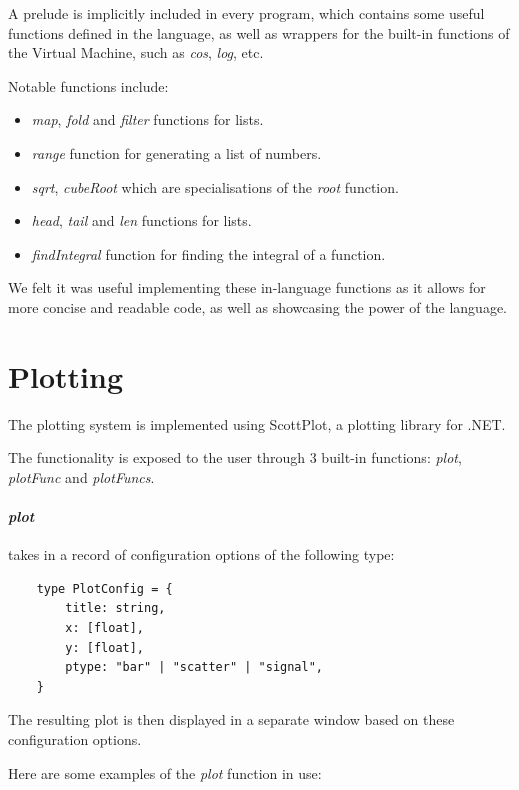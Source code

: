 A prelude is implicitly included in every program, which contains some useful functions defined in the language, as 
well as wrappers for the built-in functions of the Virtual Machine, such as \textit{cos}, \textit{log}, etc.

Notable functions include:

\begin{itemize}
    \item \textit{map}, \textit{fold} and \textit{filter} functions for lists.
    \item \textit{range} function for generating a list of numbers.
    \item \textit{sqrt}, \textit{cubeRoot} which are specialisations of the \textit{root} function.
    \item \textit{head}, \textit{tail} and \textit{len} functions for lists.
    \item \textit{findIntegral} function for finding the integral of a function.
\end{itemize}

We felt it was useful implementing these in-language functions as it allows for more concise and readable code, as
well as showcasing the power of the language.

\section{Plotting}\label{sec:plotting}

The plotting system is implemented using ScottPlot\citep{scottPlot}, a plotting library for .NET\@.

The functionality is exposed to the user through 3 built-in functions: \textit{plot}, \textit{plotFunc} and 
\textit{plotFuncs}.

\paragraph{\textit{plot}} takes in a record of configuration options of the following type:

\begin{verbatim}
    type PlotConfig = {
        title: string,
        x: [float],
        y: [float],
        ptype: "bar" | "scatter" | "signal",
    }
\end{verbatim}

The resulting plot is then displayed in a separate window based on these configuration options.

Here are some examples of the \textit{plot} function in use:

